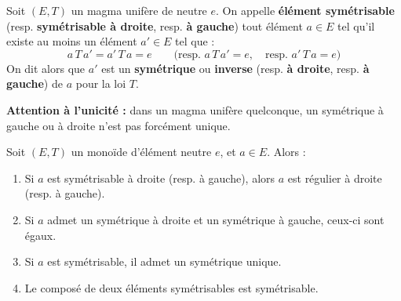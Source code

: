 \documentclass[a4paper,11pt]{article}
\newcommand{\mot}[1]{\textcolor{bordeaux}{\textbf{#1}}}
\begin{document}
\begin{definition}
Soit $(E, T)$ un magma unifère de neutre $e$. On appelle \mot{élément symétrisable} (resp. \mot{symétrisable à droite}, resp. \mot{à gauche}) tout élément $a \in E$ tel qu'il existe au moins un élément $a' \in E$ tel que :
\[
a \, T \, a' = a' \, T \, a = e \qquad \text{(resp. } a \, T \, a' = e, \quad \text{resp. } a' \, T \, a = e \text{)}
\]
On dit alors que $a'$ est un \mot{symétrique} ou \mot{inverse} (resp. \mot{à droite}, resp. \mot{à gauche}) de $a$ pour la loi $T$.
\end{definition}

\begin{remarque}
\textbf{Attention à l'unicité :} dans un magma unifère quelconque, un symétrique à gauche ou à droite n'est pas forcément unique.
\end{remarque}

\begin{theoreme}
Soit $(E, T)$ un monoïde d'élément neutre $e$, et $a \in E$. Alors :
\begin{enumerate}
    \item Si $a$ est symétrisable à droite (resp. à gauche), alors $a$ est régulier à droite (resp. à gauche).
    \item Si $a$ admet un symétrique à droite et un symétrique à gauche, ceux-ci sont égaux.
    \item Si $a$ est symétrisable, il admet un symétrique unique.
    \item Le composé de deux éléments symétrisables est symétrisable.
\end{enumerate}
\end{theoreme}
\end{document}
